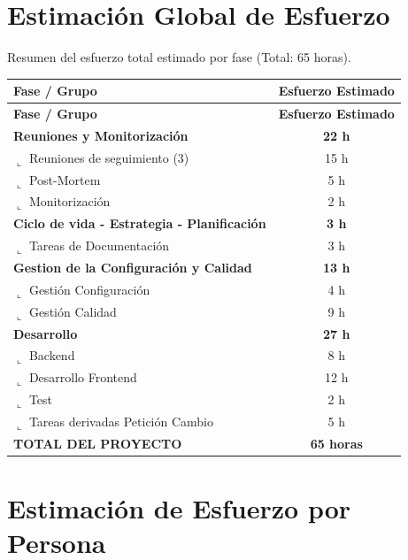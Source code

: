 \documentclass[12pt,a4paper,titlepage]{article}
\begin{document}
\newpage

\section{Estimación Global de Esfuerzo}

Resumen del esfuerzo total estimado por fase (Total: 65 horas).

\vspace{0.5cm}

\begin{longtable}{@{}lc@{}}
    \toprule
    \textbf{Fase / Grupo} & \textbf{Esfuerzo Estimado} \\ \midrule
    \endfirsthead
    \toprule
    \textbf{Fase / Grupo} & \textbf{Esfuerzo Estimado} \\ \midrule
    \endhead
    \bottomrule
    \endfoot
    \bottomrule

    \textbf{Reuniones y Monitorización} & \textbf{22 h} \\
    $\llcorner$ Reuniones de seguimiento (3) & 15 h \\
    $\llcorner$ Post-Mortem & 5 h \\
    $\llcorner$ Monitorización & 2 h \\ \addlinespace

    \textbf{Ciclo de vida - Estrategia - Planificación} & \textbf{3 h} \\
    $\llcorner$ Tareas de Documentación & 3 h \\ \addlinespace

    \textbf{Gestion de la Configuración y Calidad} & \textbf{13 h} \\
    $\llcorner$ Gestión Configuración & 4 h \\
    $\llcorner$ Gestión Calidad & 9 h \\ \addlinespace

    \textbf{Desarrollo} & \textbf{27 h} \\
    $\llcorner$ Backend & 8 h \\
    $\llcorner$ Desarrollo Frontend & 12 h \\
    $\llcorner$ Test & 2 h \\ 
    $\llcorner$ Tareas derivadas Petición Cambio & 5 h \\ \midrule
    
    \textbf{TOTAL DEL PROYECTO} & \textbf{65 horas} \\
\end{longtable}

\section{Estimación de Esfuerzo por Persona}
\end{document}
